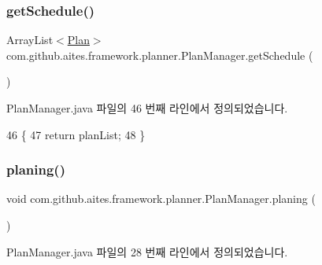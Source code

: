 \subsubsection{\texorpdfstring{get\+Schedule()}{getSchedule()}}
{\footnotesize\ttfamily Array\+List$<$\mbox{\hyperlink{classcom_1_1github_1_1aites_1_1framework_1_1planner_1_1_plan}{Plan}}$>$ com.\+github.\+aites.\+framework.\+planner.\+Plan\+Manager.\+get\+Schedule (\begin{DoxyParamCaption}{ }\end{DoxyParamCaption})}



Plan\+Manager.\+java 파일의 46 번째 라인에서 정의되었습니다.


\begin{DoxyCode}
46                                         \{
47         \textcolor{keywordflow}{return} planList;
48     \}
\end{DoxyCode}
\mbox{\label{classcom_1_1github_1_1aites_1_1framework_1_1planner_1_1_plan_manager_a53031b4950970b30a52ddba619169573}} 
\subsubsection{\texorpdfstring{planing()}{planing()}}
{\footnotesize\ttfamily void com.\+github.\+aites.\+framework.\+planner.\+Plan\+Manager.\+planing (\begin{DoxyParamCaption}{ }\end{DoxyParamCaption})}



Plan\+Manager.\+java 파일의 28 번째 라인에서 정의되었습니다.


